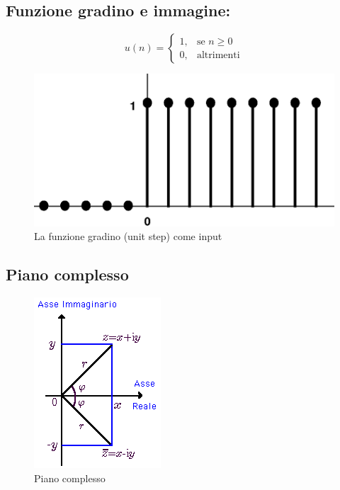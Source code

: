 \documentclass[a4paper, 12pt, italian]{book}
\begin{document}
\subsection*{Funzione gradino e immagine:}
\begin{equation*}
u(n)=
\begin{cases} 
1, & \mbox{se }n\geq 0 \\ 
0, & \mbox{altrimenti}
\end{cases} 
\end{equation*}

\begin{figure}[h]
	\centering
	\includegraphics[scale=0.5]{immagini/gradino}
	\caption{ La funzione gradino (unit step) come input }
	\label{fig: Unit step}
\end{figure}

\pagebreak
\subsection*{Piano complesso}
\begin{figure}[h]
	\centering
	\includegraphics[scale=1.2]{immagini/pianoComplesso}
	\caption{ Piano complesso }
	\label{fig: piano complesso}
\end{figure}
\end{document}
